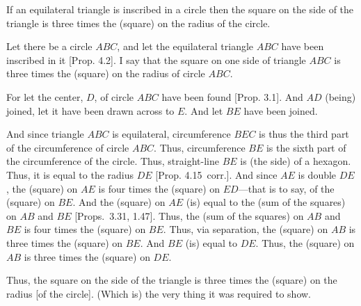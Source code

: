\begin{Parallel}{}{}
{If an equilateral triangle is inscribed in a circle then the
square on the side of the triangle is three times the (square) on
the radius of the circle.

Let there be a circle $ABC$, and let the equilateral triangle $ABC$ have
been inscribed in it  [Prop. 4.2]. I say that the square on one side of triangle
$ABC$ is three times the (square) on the radius of circle $ABC$. 

\epsfysize=2.5in
\centerline{}

For let the center, $D$, of circle $ABC$ have been found [Prop. 3.1].
And  $AD$ (being) joined, let it have been drawn across to $E$. 
And let $BE$ have been joined.

And since triangle $ABC$ is equilateral, circumference $BEC$ is thus the
third part of the circumference of circle $ABC$. Thus, 
circumference $BE$ is the sixth part of the circumference of the circle. 
Thus, straight-line $BE$ is (the side) of a hexagon. Thus, it is equal to the radius
$DE$ [Prop. 4.15~corr.]. And since $AE$ is double $DE$, the (square)
on $AE$ is four times the (square) on $ED$---that is to say, of the
(square) on $BE$.  And the (square) on $AE$ (is) equal to
the (sum of the squares) on $AB$ and $BE$ [Props.~3.31, 1.47]. 
Thus, the (sum of the squares) on $AB$ and $BE$ is four times the
(square) on $BE$. Thus, via separation, the (square) on $AB$ is three
times the (square) on $BE$. And $BE$ (is) equal to $DE$. Thus, the
(square) on $AB$ is three times the (square) on $DE$.

Thus, the square on the side of the triangle is three times the (square)
on the radius [of the circle]. (Which is) the very thing it was required to show.}
\end{Parallel}

